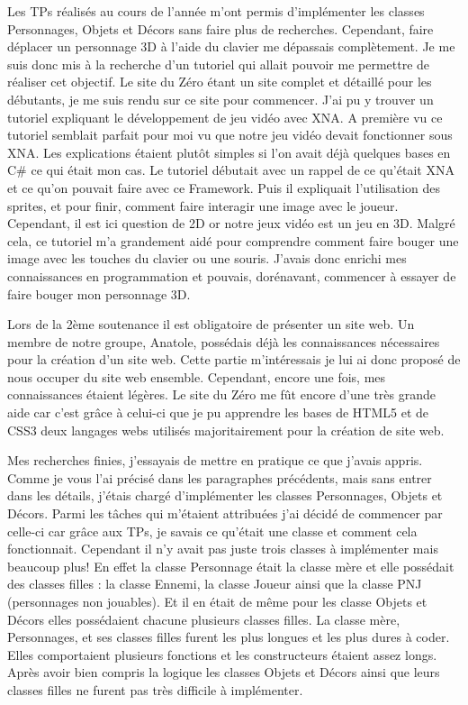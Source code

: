 \documentclass[12pt]{article}
\begin{document}
Les TPs réalisés au cours de l'année m'ont permis d'implémenter les classes Personnages, Objets et Décors sans faire plus de recherches. Cependant, faire déplacer un personnage 3D à l'aide du clavier me dépassais complètement. Je me suis donc mis à la recherche d'un tutoriel qui allait pouvoir me permettre de réaliser cet objectif. Le site du Zéro étant un site complet et détaillé pour les débutants, je me suis rendu sur ce site pour commencer. J'ai pu y trouver un tutoriel expliquant le développement de jeu vidéo avec XNA. A première vu ce tutoriel semblait parfait pour moi vu que notre jeu vidéo devait fonctionner sous XNA. Les explications étaient plutôt simples si l'on avait déjà quelques bases en C\# ce qui était mon cas. Le tutoriel débutait avec un rappel de ce qu'était XNA et ce qu'on pouvait faire avec ce Framework. Puis il expliquait l'utilisation des sprites, et pour finir, comment faire interagir une image avec le joueur. Cependant, il est ici question de 2D or notre jeux vidéo est un jeu en 3D. Malgré cela, ce tutoriel m'a grandement aidé pour comprendre comment faire bouger une image avec les touches du clavier ou une souris. J'avais donc enrichi mes connaissances en programmation et pouvais, dorénavant, commencer à essayer de faire bouger mon personnage 3D.

Lors de la 2ème soutenance il est obligatoire de présenter un site web. Un membre de notre groupe, Anatole, possédais déjà les connaissances nécessaires pour la création d'un site web. Cette partie m'intéressais je lui ai donc proposé de nous occuper du site web ensemble. Cependant, encore une fois, mes connaissances étaient légères. Le site du Zéro me fût encore d'une très grande aide car c'est grâce à celui-ci que je pu apprendre les bases de HTML5 et de CSS3 deux langages webs utilisés majoritairement pour la création de site web.

Mes recherches finies, j'essayais de mettre en pratique ce que j'avais appris. Comme je vous l'ai précisé dans les paragraphes précédents, mais sans entrer dans les détails, j'étais chargé d'implémenter les classes Personnages, Objets et Décors. Parmi les tâches qui m'étaient attribuées j'ai décidé de commencer par celle-ci car grâce aux TPs, je savais ce qu'était une classe et comment cela fonctionnait. Cependant il n'y avait pas juste trois classes à implémenter mais beaucoup plus! En effet la classe Personnage était la classe mère et elle possédait des classes filles : la classe Ennemi, la classe Joueur ainsi que la classe PNJ (personnages non jouables). Et il en était de même pour les classe Objets et Décors elles possédaient chacune plusieurs classes filles. La classe mère, Personnages, et ses classes filles furent les plus longues et les plus dures à coder. Elles comportaient plusieurs fonctions et les constructeurs étaient assez longs. Après avoir bien compris la logique les classes Objets et Décors ainsi que leurs classes filles ne furent pas très difficile à implémenter.
\end{document}
